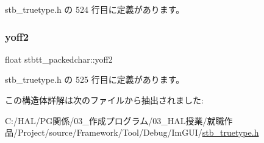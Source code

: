  stb\+\_\+truetype.\+h の 524 行目に定義があります。

\mbox{\label{structstbtt__packedchar_a2ec5bbd1010c9a9b7cbdeb7503dcaffa}} 
\subsubsection{\texorpdfstring{yoff2}{yoff2}}
{\footnotesize\ttfamily float stbtt\+\_\+packedchar\+::yoff2}



 stb\+\_\+truetype.\+h の 525 行目に定義があります。



この構造体詳解は次のファイルから抽出されました\+:\begin{DoxyCompactItemize}
\item 
C\+:/\+H\+A\+L/\+P\+G関係/03\+\_\+作成プログラム/03\+\_\+\+H\+A\+L授業/就職作品/\+Project/source/\+Framework/\+Tool/\+Debug/\+Im\+G\+U\+I/\mbox{\hyperlink{stb__truetype_8h}{stb\+\_\+truetype.\+h}}\end{DoxyCompactItemize}
